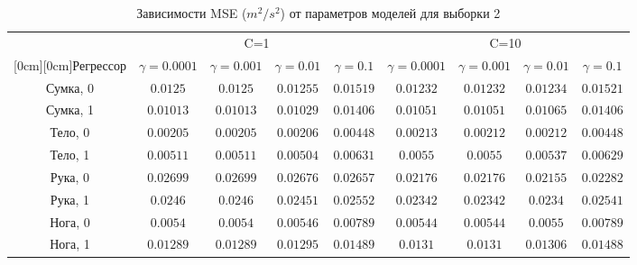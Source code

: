 \documentclass[12pt,twoside]{article}
\begin{document}
{\begin{minipage}{1.5\linewidth}
\begin{table}[H]
\caption{Зависимости MSE ($m^2/s^2$) от параметров моделей для выборки 2}
\begin{center}
\begin{tabular}{|c|c|c|c|c|c|c|c|c|}
\hline
& \multicolumn{4}{c|}{C=1} & \multicolumn{4}{c|}{C=10} \\
\cline{2-9}
\raisebox{1.5ex}[0cm][0cm]{Регрессор}
& $\gamma=0.0001$ & $\gamma=0.001$ & $\gamma=0.01$ & $\gamma=0.1$
& $\gamma=0.0001$ & $\gamma=0.001$ & $\gamma=0.01$ & $\gamma=0.1$ \\
\hline
Сумка, 0
& $0.0125$
& $0.0125$
& $0.01255$
& $0.01519$
& $0.01232$
& $0.01232$
& $0.01234$
& $0.01521$\\
\hline
Сумка, 1
& $0.01013$
& $0.01013$
& $0.01029$
& $0.01406$
& $0.01051$
& $0.01051$
& $0.01065$
& $0.01406$ \\
\hline
Тело, 0
& $0.00205$
& $0.00205$
& $0.00206$
& $0.00448$
& $0.00213$
& $0.00212$
& $0.00212$
& $0.00448$ \\
\hline
Тело, 1
& $0.00511$
& $0.00511$
& $0.00504$
& $0.00631$
& $0.0055$
& $0.0055$
& $0.00537$
& $0.00629$ \\
\hline
Рука, 0
& $0.02699$
& $0.02699$
& $0.02676$
& $0.02657$
& $0.02176$
& $0.02176$
& $0.02155$
& $0.02282$ \\
\hline
Рука, 1
& $0.0246$
& $0.0246$
& $0.02451$
& $0.02552$
& $0.02342$
& $0.02342$
& $0.0234$
& $0.02541$ \\
\hline
Нога, 0
& $0.0054$
& $0.0054$
& $0.00546$
& $0.00789$
& $0.00544$
& $0.00544$
& $0.0055$
& $0.00789$ \\
\hline
Нога, 1
& $0.01289$
& $0.01289$
& $0.01295$
& $0.01489$
& $0.0131$
& $0.0131$
& $0.01306$
& $0.01488$ \\
\hline

\end{tabular}
\end{center}
\end{table} 
\end{minipage}
} 
\end{document}
